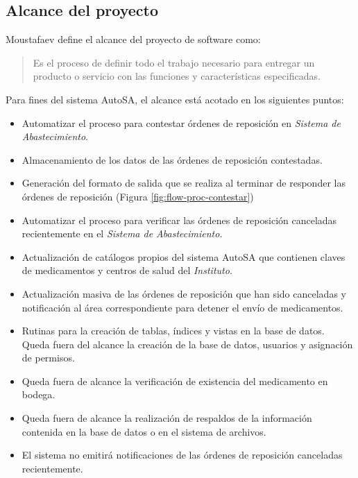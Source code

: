 \subsection{Alcance del proyecto}\label{sec:alcance}
Moustafaev\cite{ScopeManagement} define el alcance del proyecto de software como:
\begin{quote}
Es el proceso de definir todo el trabajo necesario para entregar un producto o servicio con las funciones y características especificadas.
\end{quote}
Para fines del sistema AutoSA, el alcance está acotado en los siguientes puntos:
\begin{itemize}
\item Automatizar el proceso para contestar órdenes de reposición en \textit{Sistema de Abastecimiento}.
\item Almacenamiento de los datos de las órdenes de reposición contestadas.
\item Generación del formato de salida que se realiza al terminar de responder las órdenes de reposición (Figura \ref{fig:flow-proc-contestar})
\item Automatizar el proceso para verificar las órdenes de reposición canceladas recientemente en el \textit{Sistema de Abastecimiento}.
\item Actualización de catálogos propios del sistema AutoSA que contienen claves de medicamentos y centros de salud del \textit{Instituto}.
\item Actualización masiva de las órdenes de reposición que han sido canceladas y notificación al área correspondiente para detener el envío de medicamentos.
\item Rutinas para la creación de tablas, índices y vistas en la base de datos. Queda fuera del alcance la creación de la base de datos, usuarios y asignación de permisos. 
\item Queda fuera de alcance la verificación de existencia del medicamento en bodega.
\item Queda fuera de alcance la realización de respaldos de la información contenida en la base de datos o en el sistema de archivos.
\item El sistema no emitirá notificaciones de las órdenes de reposición canceladas recientemente.
\end{itemize}


